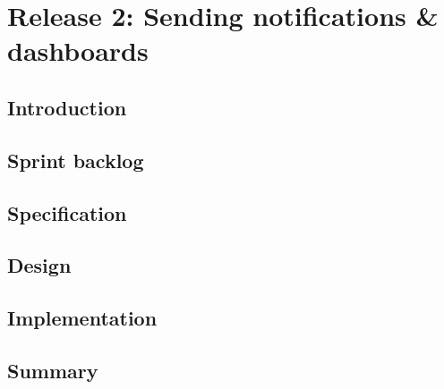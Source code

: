 \chapter{Release 2: Sending notifications \& dashboards}

\section*{Introduction}

\section{Sprint backlog}
\section{Specification}
\section{Design}
\section{Implementation}

\section*{Summary}
